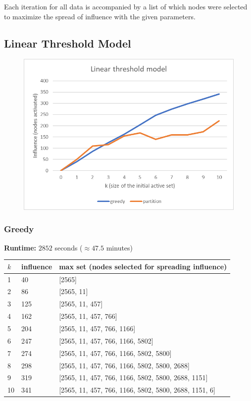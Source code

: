 \documentclass{article}
\begin{document}
  Each iteration for all data is accompanied by a list of which nodes were selected to maximize the spread of influence with the given parameters.

  \subsection{Linear Threshold Model}
  
    \begin{figure}[h]
      \includegraphics{linear}
      \centering
    \end{figure}
    
    \subsubsection{Greedy}
      
      \textbf{Runtime:} $2852$ seconds ($\approx 47.5$ minutes)

      \begin{center}
        \begin{tabular}{|lll|}
          \hline
          $k$ & influence & max set (nodes selected for spreading influence) \\
          \hline
          1  & 40  & [2565] \\
          2  & 86  & [2565, 11] \\
          3  & 125 & [2565, 11, 457] \\
          4  & 162 & [2565, 11, 457, 766] \\
          5  & 204 & [2565, 11, 457, 766, 1166] \\
          6  & 247 & [2565, 11, 457, 766, 1166, 5802] \\
          7  & 274 & [2565, 11, 457, 766, 1166, 5802, 5800] \\
          8  & 298 & [2565, 11, 457, 766, 1166, 5802, 5800, 2688] \\
          9  & 319 & [2565, 11, 457, 766, 1166, 5802, 5800, 2688, 1151] \\
          10 & 341 & [2565, 11, 457, 766, 1166, 5802, 5800, 2688, 1151, 6] \\
          \hline
        \end{tabular}
      \end{center}
    
\end{document}
